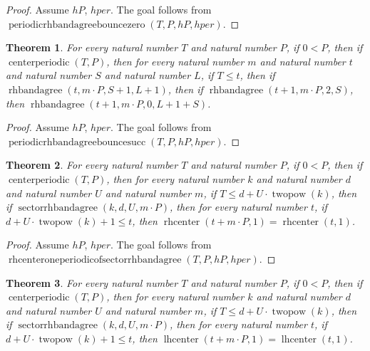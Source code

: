 \documentclass[11pt]{article}
\newtheorem{theorem}{Theorem}[section]
\theoremstyle{definition}
\begin{document}
\begin{proof}
Assume \(hP\), \(hper\).
The goal follows from \(\operatorname{periodicrhbandagreebouncezero}(T, P, hP, hper)\).
\end{proof}
\begin{theorem}
\label{ll:paper:periodic-rhbandagree-bounce-succ}
For every natural number \(T\) and natural number \(P\), if \(0 < P\), then if \(\operatorname{centerperiodic}(T, P)\), then for every natural number \(m\) and natural number \(t\) and natural number \(S\) and natural number \(L\), if \(T \le t\), then if \(\operatorname{rhbandagree}(t, m \cdot P, S + 1, L + 1)\), then if \(\operatorname{rhbandagree}(t + 1, m \cdot P, 2, S)\), then \(\operatorname{rhbandagree}(t + 1, m \cdot P, 0, L + 1 + S)\).
\end{theorem}
\begin{proof}
Assume \(hP\), \(hper\).
The goal follows from \(\operatorname{periodicrhbandagreebouncesucc}(T, P, hP, hper)\).
\end{proof}
\begin{theorem}
\label{ll:paper:rhcenter-one-periodic-of-sector-rhbandagree}
For every natural number \(T\) and natural number \(P\), if \(0 < P\), then if \(\operatorname{centerperiodic}(T, P)\), then for every natural number \(k\) and natural number \(d\) and natural number \(U\) and natural number \(m\), if \(T \le d + U \cdot \operatorname{twopow}(k)\), then if \(\operatorname{sectorrhbandagree}(k, d, U, m \cdot P)\), then for every natural number \(t\), if \(d + U \cdot \operatorname{twopow}(k) + 1 \le t\), then \(\operatorname{rhcenter}(t + m \cdot P, 1) = \operatorname{rhcenter}(t, 1)\).
\end{theorem}
\begin{proof}
Assume \(hP\), \(hper\).
The goal follows from \(\operatorname{rhcenteroneperiodicofsectorrhbandagree}(T, P, hP, hper)\).
\end{proof}
\begin{theorem}
\label{ll:paper:lhcenter-one-periodic-of-sector-rhbandagree}
For every natural number \(T\) and natural number \(P\), if \(0 < P\), then if \(\operatorname{centerperiodic}(T, P)\), then for every natural number \(k\) and natural number \(d\) and natural number \(U\) and natural number \(m\), if \(T \le d + U \cdot \operatorname{twopow}(k)\), then if \(\operatorname{sectorrhbandagree}(k, d, U, m \cdot P)\), then for every natural number \(t\), if \(d + U \cdot \operatorname{twopow}(k) + 1 \le t\), then \(\operatorname{lhcenter}(t + m \cdot P, 1) = \operatorname{lhcenter}(t, 1)\).
\end{theorem}
\end{document}
